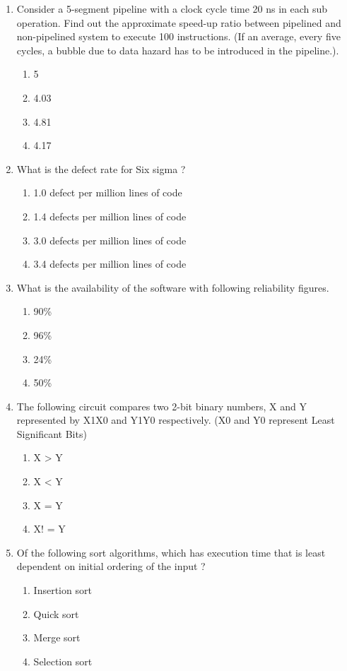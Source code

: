 \documentclass[12pt]{article}
\begin{document}
\begin{enumerate}
\item[56.] Consider a 5-segment pipeline with a clock cycle time 20 ns in each sub operation. Find out the approximate speed-up ratio between pipelined and non-pipelined system to execute 100 instructions. (If an average, every five cycles, a bubble due to data hazard has to be introduced in the pipeline.).
\begin{enumerate}[label=\Alph*.]
  \item 5
  \item 4.03
  \item 4.81
  \item 4.17
\end{enumerate}

\item[57.] What is the defect rate for Six sigma ?
\begin{enumerate}[label=\Alph*.]
  \item 1.0 defect per million lines of code
  \item 1.4 defects per million lines of code
  \item 3.0 defects per million lines of code
  \item 3.4 defects per million lines of code
\end{enumerate}

\item[58.] What is the availability of the software with following reliability figures.
\begin{enumerate}[label=\Alph*.]
  \item 90\%
  \item 96\%
  \item 24\%
  \item 50\%
\end{enumerate}

\item[59.] The following circuit compares two 2-bit binary numbers, X and Y represented by X1X0 and Y1Y0 respectively. (X0 and Y0 represent Least Significant Bits)
\begin{enumerate}[label=\Alph*.]
  \item X \textgreater{} Y
  \item X \textless{} Y
  \item X = Y
  \item X! = Y
\end{enumerate}

\item[60.] Of the following sort algorithms, which has execution time that is least dependent on initial ordering of the input ?
\begin{enumerate}[label=\Alph*.]
  \item Insertion sort
  \item Quick sort
  \item Merge sort
  \item Selection sort
\end{enumerate}


\end{enumerate}
\end{document}
